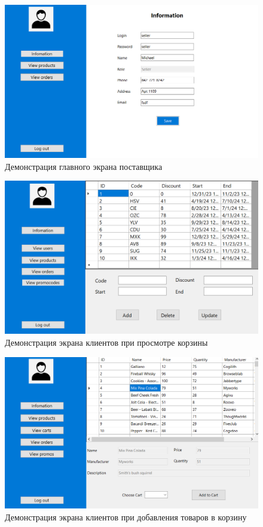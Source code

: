 \begin{figure}[h]
	\centering
	\includegraphics[height=0.4\textheight]{img/seller_0.png}
	\caption{Демонстрация главного экрана поставщика}
	\label{img:ex8}
\end{figure}

\begin{figure}[h]
	\centering
	\includegraphics[height=0.4\textheight]{img/admin_4.png}
	\caption{Демонстрация экрана клиентов при просмотре корзины}
	\label{img:ex9}
\end{figure}

\begin{figure}[h]
	\centering
	\includegraphics[height=0.4\textheight]{img/client_1.png}
	\caption{Демонстрация экрана клиентов при добавления товаров в корзину}
	\label{img:ex10}
\end{figure}

